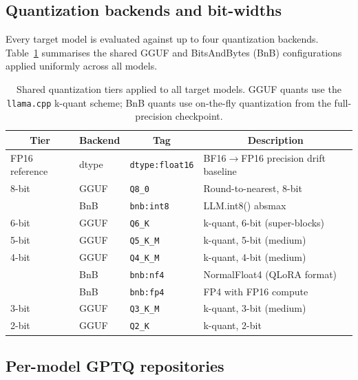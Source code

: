 \subsection{Quantization backends and bit-widths}
\label{app:quant_tiers}

Every target model is evaluated against up to four quantization backends.
Table~\ref{tab:quant_tiers} summarises the shared GGUF and BitsAndBytes (BnB) configurations applied uniformly across all models.

\begin{table}[h]
\centering
\caption{Shared quantization tiers applied to all target models. GGUF quants use the \texttt{llama.cpp} k-quant scheme; BnB quants use on-the-fly quantization from the full-precision checkpoint.}
\label{tab:quant_tiers}
\small
\begin{tabular}{@{}llll@{}}
\toprule
\multicolumn{1}{c}{\textbf{Tier}} & \multicolumn{1}{c}{\textbf{Backend}} & \multicolumn{1}{c}{\textbf{Tag}} & \multicolumn{1}{c}{\textbf{Description}} \\
\midrule
FP16 reference & dtype   & \texttt{dtype:float16} & BF16$\to$FP16 precision drift baseline \\
\midrule
8-bit          & GGUF    & \texttt{Q8\_0}         & Round-to-nearest, 8-bit \\
               & BnB     & \texttt{bnb:int8}      & LLM.int8() absmax \\
6-bit          & GGUF    & \texttt{Q6\_K}         & k-quant, 6-bit (super-blocks) \\
5-bit          & GGUF    & \texttt{Q5\_K\_M}      & k-quant, 5-bit (medium) \\
4-bit          & GGUF    & \texttt{Q4\_K\_M}      & k-quant, 4-bit (medium) \\
               & BnB     & \texttt{bnb:nf4}       & NormalFloat4 (QLoRA format) \\
               & BnB     & \texttt{bnb:fp4}       & FP4 with FP16 compute \\
3-bit          & GGUF    & \texttt{Q3\_K\_M}      & k-quant, 3-bit (medium) \\
2-bit          & GGUF    & \texttt{Q2\_K}         & k-quant, 2-bit \\
\bottomrule
\end{tabular}
\end{table}


\subsection{Per-model GPTQ repositories}
\label{app:gptq_awq}

